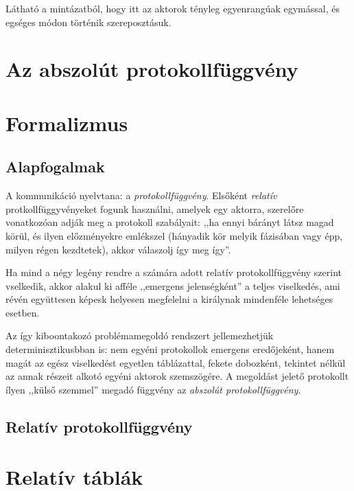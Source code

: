 \documentclass{article}
\begin{document}
	Látható a mintázatból, hogy itt az aktorok tényleg egyenrangúak egymással, és egséges módon történik szereposztásuk.

	\section{Az abszolút protokollfüggvény}


	\section{Formalizmus}

	\subsection{Alapfogalmak}

	A kommunikáció nyelvtana: a \emph{protokollfüggvény}. Elsőként \emph{relatív} protkollfüggyvényeket fogunk használni, amelyek egy aktorra, szerelőre vonatkozóan adják meg a protokoll szabályait: ,,ha ennyi bárányt látsz magad körül, és ilyen előzményekre emlékszel (hányadik kör melyik fázisában vagy épp, milyen régen kezdtetek), akkor válaszolj így meg így''.

	Ha mind a négy legény rendre a számára adott relatív protokollfüggvény szerint vselkedik, akkor alakul ki afféle ,,emergens jelenségként'' a teljes viselkedés, ami révén együttesen képesk helyesen megfelelni a királynak mindenféle lehetséges esetben.

	Az így kiboontakozó problémamegoldó rendszert jellemezhetjük determinisztikusbban is: nem egyéni protokollok emergens eredőjeként, hanem magát az egész viselkedést egyetlen táblázattal, fekete dobozként, tekintet nélkül az annak részeit alkotó egyéni aktorok szemszögére. A megoldást jelető protokollt ílyen ,,külső szemmel'' megadó függvény az \emph{abszolút protokollfüggvény}.

	\subsection{Relatív protokollfüggvény}



	\section{Relatív táblák}
\end{document}
